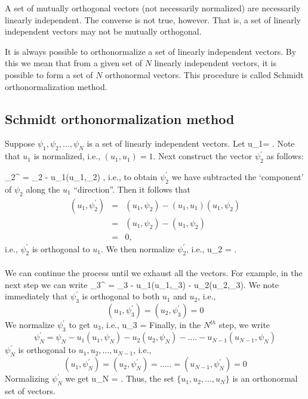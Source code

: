 A set of mutually orthogonal vectors (not necessarily normalized) are necessarily linearly independent. The converse is not true, however. That is, a set of linearly independent vectors may not be mutually orthogonal.

It is always possible to orthonormalize a set of linearly independent vectors. By this we mean that from a given set of $N$ linearly independent vectors, it is possible to form a set of $N$ orthonormal vectors. This procedure is called Schmidt orthonormalization method.



\subsection{Schmidt orthonormalization method}

Suppose $\psi_1, \psi_2, ..., \psi_N$ is a set of linearly independent vectors. Let
\be
u_1= .
\ee
Note that $u_1$ is normalized, i.e., $(u_1,u_1)=1$. Next construct the vector $\psi_{2}^{\prime}$ as follows:

\be
\psi_{2}^{\prime} = \psi_2 - u_1(u_1,\psi_2) ,
\ee
i.e., to obtain $\psi_{2}^{\prime}$ we have subtracted the `component' of $\psi_2$ along the $u_1$ ``direction''. Then it follows that
\begin{eqnarray*}
(u_1,\psi_2^{\prime}) &= &(u_1,\psi_2) - (u_1,u_1)(u_1,\psi_2) \\
                      &=& (u_1,\psi_2) - (u_1,\psi_2)       \\
                      &=& 0,
\end{eqnarray*}
i.e., $\psi_2^{\prime}$ is orthogonal to $u_1$. We then normalize $\psi_2^{\prime}$, i.e.,
\be
u_2 = .
\ee

\paragraph{}
We can continue the process until we exhaust all the vectors. For example, in the next step we can write
\be
\psi_3^{\prime} = \psi_3 - u_1(u_1,\psi_3) - u_2(u_2,\psi_3).
\ee
We note immediately that $\psi_3^{\prime}$ is orthogonal to both $u_1$ and $u_2$, i.e.,
$$(u_1, \psi_3^{\prime}) = (u_2,\psi_3^{\prime}) = 0$$
We normalize $\psi_3^{\prime}$ to get $u_3$, i.e.,
\be
u_3 = 
\ee
Finally, in the $N^{th}$ step, we write
$$\psi_N^{\prime} = \psi_N - u_1(u_1,\psi_N) - u_2(u_2,\psi_N) - .... - u_{N-1}(u_{N-1},\psi_N)$$
$\psi_N^{\prime}$ is orthogonal to $u_1, u_2, ..., u_{N-1}$, i.e.,
$$(u_1,\psi_N^{\prime}) = (u_2,\psi_N^{\prime}) = ..... = (u_{N-1},\psi_N^{\prime}) = 0$$
Normalizing $\psi_N^{\prime}$ we get
\be
 u_N = .
\ee
Thus, the set $\{u_1,u_2,...,u_N\}$ is an orthonormal set of vectors.


